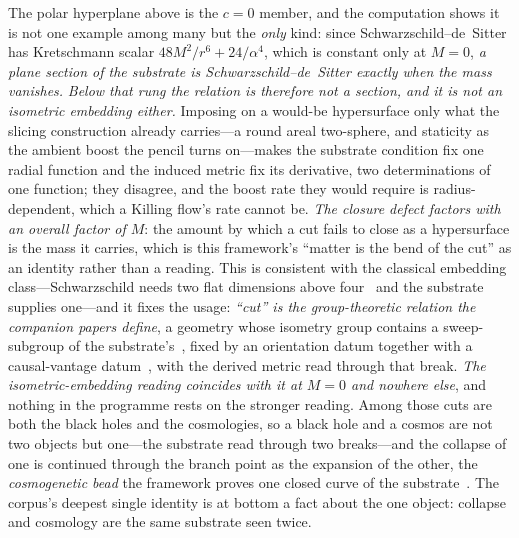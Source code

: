 \documentclass[11pt,a4paper]{article}
\theoremstyle{definition}
\begin{document}
The polar hyperplane above is the $c=0$ member, and the computation shows it is not one
example among many but the \emph{only} kind: since Schwarzschild--de~Sitter has Kretschmann scalar
$48M^{2}/r^{6}+24/\alpha^{4}$, which is constant only at $M=0$, \emph{a plane section of the substrate is
Schwarzschild--de~Sitter exactly when the mass vanishes.} \emph{Below that rung the relation is therefore
not a section, and it is not an isometric embedding either.} Imposing on a would-be hypersurface only what
the slicing construction already carries---a round areal two-sphere, and staticity as the ambient boost the
pencil turns on---makes the substrate condition fix one radial function and the induced metric fix its
derivative, two determinations of one function; they disagree, and the boost rate they would require is
radius-dependent, which a Killing flow's rate cannot be. \emph{The closure defect factors with an overall
factor of $M$}: the amount by which a cut fails to close as a hypersurface is the mass it carries, which is
this framework's ``matter is the bend of the cut'' as an identity rather than a reading. This is consistent
with the classical embedding class---Schwarzschild needs two flat dimensions above four~\cite{Fronsdal1959} and the substrate
supplies one---and it fixes the usage: \emph{``cut'' is the group-theoretic relation the companion papers
define}, a geometry whose isometry group contains a sweep-subgroup of the substrate's~\cite{JanzenRange},
fixed by an orientation datum together with a causal-vantage datum~\cite{JanzenAlgebroid}, with the derived
metric read through that break. \emph{The isometric-embedding reading coincides with it at $M=0$ and nowhere
else}, and nothing in the programme rests on the stronger reading. Among those cuts are both the black holes and the cosmologies, so a black hole and a cosmos are not two objects but one---the substrate read through two breaks---and the collapse of one is continued through the branch point as the expansion of the other, the \emph{cosmogenetic bead} the framework proves one closed curve of the substrate~\cite{JanzenCRframework}. The corpus's deepest single identity is at bottom a fact about the one object: collapse and cosmology are the same substrate seen twice.
\end{document}
